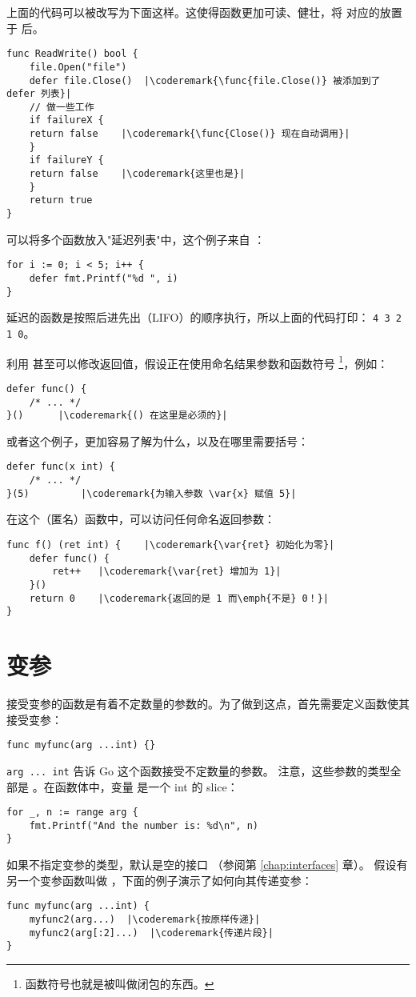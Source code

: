 上面的代码可以被改写为下面这样。这使得函数更加可读、健壮，将
 对应的放置于  后。
\begin{lstlisting}[caption=With defer]
func ReadWrite() bool {
    file.Open("file")
    defer file.Close()	|\coderemark{\func{file.Close()} 被添加到了 defer 列表}|
    // 做一些工作
    if failureX {
	return false    |\coderemark{\func{Close()} 现在自动调用}|
    }
    if failureY {
	return false    |\coderemark{这里也是}|
    }
    return true
}
\end{lstlisting}

可以将多个函数放入"延迟列表"中，这个例子来自 \cite{effective_go}：
\begin{lstlisting}
for i := 0; i < 5; i++ { 
    defer fmt.Printf("%d ", i) 
} 
\end{lstlisting}
延迟的函数是按照后进先出（LIFO）的顺序执行，所以上面的代码打印：
\lstinline{4 3 2 1 0}。

利用  甚至可以修改返回值，假设正在使用命名结果参数和函数符号
\footnote{函数符号也就是被叫做闭包的东西。}，例如：
\begin{lstlisting}[caption=函数符号]
defer func() {
	/* ... */
}()		 |\coderemark{() 在这里是必须的}|
\end{lstlisting}
或者这个例子，更加容易了解为什么，以及在哪里需要括号：
\begin{lstlisting}[caption=带参数的函数符号]
defer func(x int) {
	/* ... */
}(5)		 |\coderemark{为输入参数 \var{x} 赋值 5}|
\end{lstlisting}
在这个（匿名）函数中，可以访问任何命名返回参数：
\begin{lstlisting}[caption=在 defer 中访问返回值]
func f() (ret int) {    |\coderemark{\var{ret} 初始化为零}|
	defer func() {
		ret++	|\coderemark{\var{ret} 增加为 1}|
	}()
	return 0	|\coderemark{返回的是 1 而\emph{不是} 0！}|
}
\end{lstlisting}

\section{变参}
接受变参的函数是有着不定数量的参数的。为了做到这点，首先需要定义函数使其接受变参：
\begin{lstlisting}
func myfunc(arg ...int) {}
\end{lstlisting}
\lstinline{arg ... int} 告诉 Go 这个函数接受不定数量的参数。
注意，这些参数的类型全部是 。在函数体中，变量
 是一个 int 的 slice：
\begin{lstlisting}
for _, n := range arg {
    fmt.Printf("And the number is: %d\n", n)
}
\end{lstlisting}
如果不指定变参的类型，默认是空的接口  （参阅第 \ref{chap:interfaces} 章）。
假设有另一个变参函数叫做 ，下面的例子演示了如何向其传递变参：
\begin{lstlisting}
func myfunc(arg ...int) {
    myfunc2(arg...)  |\coderemark{按原样传递}|
    myfunc2(arg[:2]...)  |\coderemark{传递片段}|
}
\end{lstlisting}

